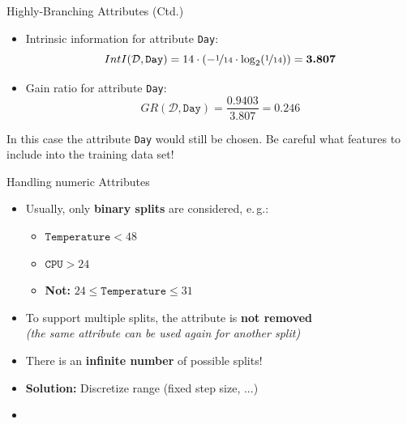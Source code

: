 \begin{frame}{Highly-Branching Attributes (Ctd.)}{}
	\begin{itemize}
		\item Intrinsic information for attribute \texttt{Day}:
		\begin{equation}
			IntI(\mathcal{D}, \texttt{Day}) = 14 \cdot (-\nicefrac{1}{14} \cdot \log_2 (\nicefrac{1}{14})) = \bm{3.807}
		\end{equation}
		\item Gain ratio for attribute \texttt{Day}:
		\begin{equation}
			GR(\mathcal{D}, \texttt{Day}) = \frac{0.9403}{3.807} = \bm{0.246}
		\end{equation}
	\end{itemize}

	\vspace*{-3mm}
	\begin{boxBlue}
		\footnotesize
		In this case the attribute \texttt{Day} would still be chosen.
		Be careful what features to include into the training data set! 
	\end{boxBlue}
\end{frame}


\begin{frame}{Handling numeric Attributes}{}
	\begin{itemize}
		\item Usually, only \textbf{binary splits} are considered, e.\,g.:
		\begin{itemize}
			\item $\texttt{Temperature} < 48$
			\item $\texttt{CPU} > 24$
			\item \textbf{Not:} $24 \le \texttt{Temperature} \le 31$
		\end{itemize}
		\item To support multiple splits, the attribute is \textbf{not removed} \\
			{\footnotesize \textit{(the same attribute can be used again for another split)}}
		\item {} There is an \textbf{infinite number} of possible splits!
		\item \textbf{Solution:} Discretize range (fixed step size, ...)
		\item {}
	\end{itemize}
\end{frame}


